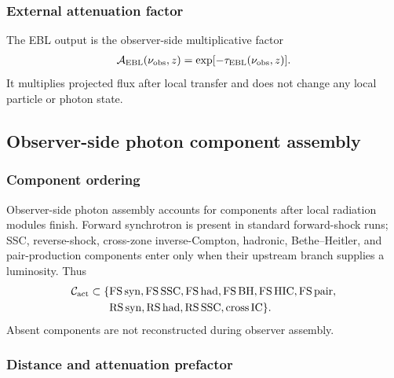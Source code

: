 \documentclass[twocolumn]{aastex702}
\begin{document}
\subsubsection{External attenuation factor}

The EBL output is the observer-side multiplicative factor
\begin{equation}
\begin{aligned}
\mathcal{A}_{\rm EBL}(\nu_{\rm obs},z)
=\exp[-\tau_{\rm EBL}(\nu_{\rm obs},z)].
\end{aligned}
\end{equation}
It multiplies projected flux after local transfer and does not change any local
particle or photon state.

\subsection{Observer-side photon component assembly}

\subsubsection{Component ordering}

Observer-side photon assembly accounts for components after local radiation
modules finish.  Forward synchrotron is present in standard forward-shock runs;
SSC, reverse-shock, cross-zone inverse-Compton, hadronic, Bethe--Heitler, and
pair-production components enter only when their upstream branch supplies a
luminosity.  Thus
\begin{equation}
\begin{aligned}
{\cal C}_{\rm act}\subset
\{&{\rm FS\,syn},{\rm FS\,SSC},{\rm FS\,had},{\rm FS\,BH},
{\rm FS\,HIC},{\rm FS\,pair},\\
&{\rm RS\,syn},{\rm RS\,had},{\rm RS\,SSC},{\rm cross\,IC}\}.
\end{aligned}
\end{equation}
Absent components are not reconstructed during observer assembly.

\subsubsection{Distance and attenuation prefactor}
\end{document}
